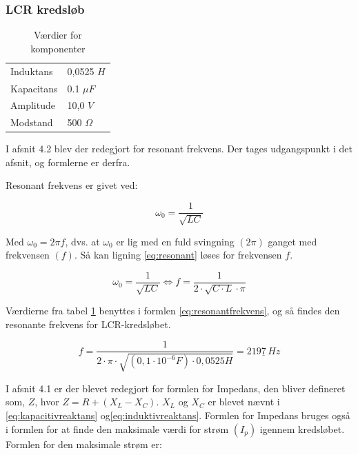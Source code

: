 \subsubsection{LCR kredsløb}

\begin{table}[H]
\centering
\begin{tabular}{l|l}
Induktans  & 0,0525 $H$ \\ 
Kapacitans & 0.1 $\mu F$   \\
Amplitude  & 10,0 $V$   \\
Modstand   & 500 $\Omega$ \\
\end{tabular}
\caption{Værdier for komponenter}
\label{tabular:value}
\end{table}

I afsnit 4.2 blev der redegjort for resonant frekvens. Der tages udgangspunkt i det afsnit, og formlerne er derfra.

Resonant frekvens er givet ved:

\begin{equation} 
\omega_0 = \frac{1}{\sqrt{LC}}
\label{eq:resonant}
\end{equation}

Med $\omega_0 = 2 \pi f$, dvs. at $\omega_0$ er lig med en fuld svingning $(2\pi)$ ganget med frekvensen $(f)$. Så kan ligning \ref{eq:resonant} løses for frekvensen $f$. \cite{fysikbog}

\begin{equation} 
\omega_0 = \frac{1}{\sqrt{LC}} \Leftrightarrow f = \frac{1}{2 \cdot \sqrt{C \cdot L} \cdot \pi}
\label{eq:resonantfrekvens}
\end{equation}

Værdierne fra tabel \ref{tabular:value} benyttes i formlen \ref{eq:resonantfrekvens}, og så findes den resonante frekvens for LCR-kredsløbet.

\begin{equation*}
f = \frac{1}{2 \cdot \pi \cdot \sqrt{(0,1 \cdot 10^{-6} F) \cdot 0,0525 H}} = \underline{2197 \, Hz}
\end{equation*}

I afsnit 4.1 er der blevet redegjort for formlen for Impedans, den bliver defineret som, $Z$, hvor $Z = R + (X_L - X_C)$. $X_L$ og $X_C$ er blevet nævnt i \vref{eq:kapacitivreaktans} og\vref{eq:induktivreaktans}. Formlen for Impedans bruges også i formlen for at finde den maksimale værdi for strøm $(I_p)$ igennem kredsløbet. Formlen for den maksimale strøm er:


